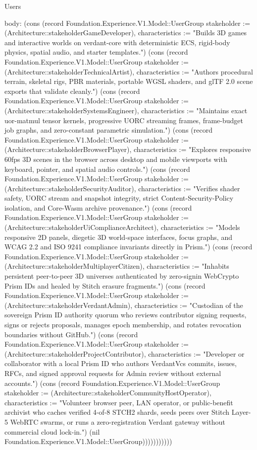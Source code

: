 \begin{lexlean}{Users}
\begin{semanticmodule}
{  body: (cons (record Foundation.Experience.V1.Model::UserGroup {stakeholder := (Architecture::stakeholderGameDeveloper), characteristics := "Builds 3D games and interactive worlds on verdant-core with deterministic ECS, rigid-body physics, spatial audio, and starter templates."}) (cons (record Foundation.Experience.V1.Model::UserGroup {stakeholder := (Architecture::stakeholderTechnicalArtist), characteristics := "Authors procedural terrain, skeletal rigs, PBR materials, portable WGSL shaders, and glTF 2.0 scene exports that validate cleanly."}) (cons (record Foundation.Experience.V1.Model::UserGroup {stakeholder := (Architecture::stakeholderSystemsEngineer), characteristics := "Maintains exact uor-matmul tensor kernels, progressive UORC streaming frames, frame-budget job graphs, and zero-constant parametric simulation."}) (cons (record Foundation.Experience.V1.Model::UserGroup {stakeholder := (Architecture::stakeholderBrowserPlayer), characteristics := "Explores responsive 60fps 3D scenes in the browser across desktop and mobile viewports with keyboard, pointer, and spatial audio controls."}) (cons (record Foundation.Experience.V1.Model::UserGroup {stakeholder := (Architecture::stakeholderSecurityAuditor), characteristics := "Verifies shader safety, UORC stream and snapshot integrity, strict Content-Security-Policy isolation, and Core-Wasm archive provenance."}) (cons (record Foundation.Experience.V1.Model::UserGroup {stakeholder := (Architecture::stakeholderUiComplianceArchitect), characteristics := "Models responsive 2D panels, diegetic 3D world-space interfaces, focus graphs, and WCAG 2.2 and ISO 9241 compliance invariants directly in Prism."}) (cons (record Foundation.Experience.V1.Model::UserGroup {stakeholder := (Architecture::stakeholderMultiplayerCitizen), characteristics := "Inhabits persistent peer-to-peer 3D universes authenticated by zero-signin WebCrypto Prism IDs and healed by Stitch erasure fragments."}) (cons (record Foundation.Experience.V1.Model::UserGroup {stakeholder := (Architecture::stakeholderVerdantAdmin), characteristics := "Custodian of the sovereign Prism ID authority quorum who reviews contributor signing requests, signs or rejects proposals, manages epoch membership, and rotates revocation boundaries without GitHub."}) (cons (record Foundation.Experience.V1.Model::UserGroup {stakeholder := (Architecture::stakeholderProjectContributor), characteristics := "Developer or collaborator with a local Prism ID who authors VerdantVcs commits, issues, RFCs, and signed approval requests for Admin review without external accounts."}) (cons (record Foundation.Experience.V1.Model::UserGroup {stakeholder := (Architecture::stakeholderCommunityHostOperator), characteristics := "Volunteer browser peer, LAN operator, or public-benefit archivist who caches verified 4-of-8 STCH2 shards, seeds peers over Stitch Layer-5 WebRTC swarms, or runs a zero-registration Verdant gateway without commercial cloud lock-in."}) (nil Foundation.Experience.V1.Model::UserGroup)))))))))))
}


\end{semanticmodule}
\end{lexlean}
